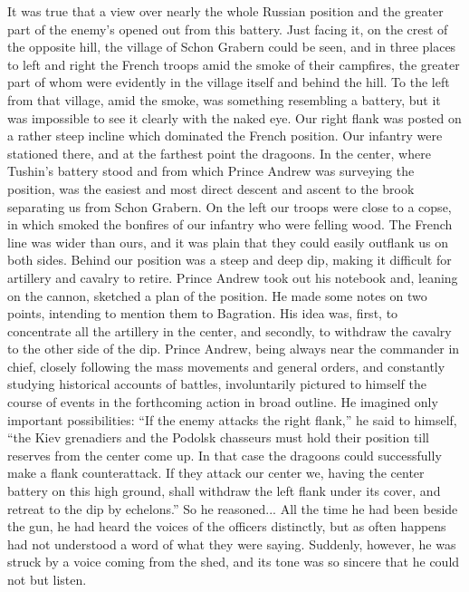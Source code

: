 It was true that a view over nearly the whole Russian position
and the greater part of the enemy's opened out from this
battery. Just facing it, on the crest of the opposite hill, the
village of Schon Grabern could be seen, and in three places to
left and right the French troops amid the smoke of their
campfires, the greater part of whom were evidently in the village
itself and behind the hill. To the left from that village, amid
the smoke, was something resembling a battery, but it was
impossible to see it clearly with the naked eye. Our right flank
was posted on a rather steep incline which dominated the French
position.  Our infantry were stationed there, and at the farthest
point the dragoons. In the center, where Tushin's battery stood
and from which Prince Andrew was surveying the position, was the
easiest and most direct descent and ascent to the brook
separating us from Schon Grabern.  On the left our troops were
close to a copse, in which smoked the bonfires of our infantry
who were felling wood. The French line was wider than ours, and
it was plain that they could easily outflank us on both
sides. Behind our position was a steep and deep dip, making it
difficult for artillery and cavalry to retire. Prince Andrew took
out his notebook and, leaning on the cannon, sketched a plan of
the position. He made some notes on two points, intending to
mention them to Bagration. His idea was, first, to concentrate
all the artillery in the center, and secondly, to withdraw the
cavalry to the other side of the dip. Prince Andrew, being always
near the commander in chief, closely following the mass movements
and general orders, and constantly studying historical accounts
of battles, involuntarily pictured to himself the course of
events in the forthcoming action in broad outline. He imagined
only important possibilities: ``If the enemy attacks the right
flank,'' he said to himself, ``the Kiev grenadiers and the
Podolsk chasseurs must hold their position till reserves from the
center come up. In that case the dragoons could successfully make
a flank counterattack. If they attack our center we, having the
center battery on this high ground, shall withdraw the left flank
under its cover, and retreat to the dip by echelons.'' So he
reasoned... All the time he had been beside the gun, he had heard
the voices of the officers distinctly, but as often happens had
not understood a word of what they were saying. Suddenly,
however, he was struck by a voice coming from the shed, and its
tone was so sincere that he could not but listen.

